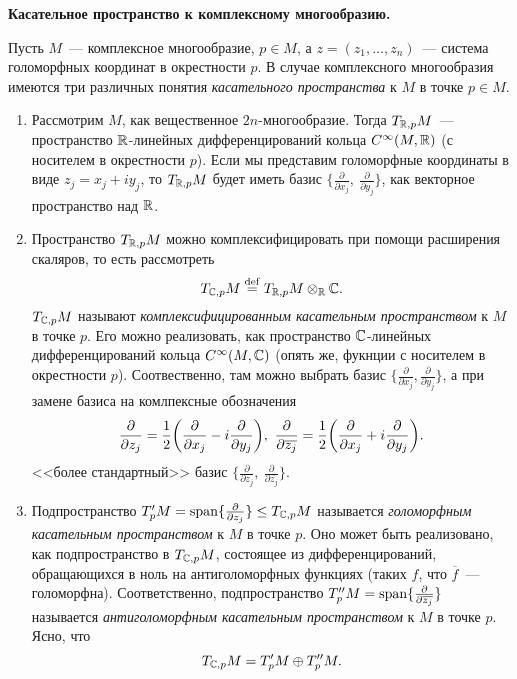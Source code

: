     \noindent\bf{Касательное пространство к комплексному многообразию.}\hypertarget{complex_tungent_space}{}

        Пусть $M$~--- комплексное многообразие, $p \in M$, а $z = (z_{1}, \ldots, z_n)$~--- система голоморфных координат в окрестности $p$.
        В случае комплексного многообразия имеются три различных понятия \emph{касательного пространства} к $M$ в точке $p \in M$.

        \begin{enumerate}
            \item Рассмотрим $M$, как вещественное $2n$-многообразие. Тогда $T_{\mathbb{R}, p}M$~--- пространство
            $\mathbb{R}$-линейных дифференцирований кольца $C^{\infty}(M, \mathbb{R})$ (с носителем в окрестности $p$).
            Если мы представим голоморфные координаты в виде $z_j = x_j + i y_j$, то $T_{\mathbb{R}, p}M$ будет иметь базис
            $\{ \frac{\partial }{\partial x_j}, \ \frac{\partial}{\partial y_j}\}$, как векторное пространство над $\mathbb{R}$.

            \item Пространство  $T_{\mathbb{R}, p}M$ можно комплексифицировать при помощи расширения скаляров, то есть рассмотреть
            \[ T_{\mathbb{C}, p}M \stackrel{\mathrm{def}}{=} T_{\mathbb{R}, p}M \otimes_{\mathbb{R}} \mathbb{C}. \]
            $T_{\mathbb{C}, p}M$ называют \emph{комплексифицированным касательным пространством} к $M$ в точке $p$.
            Его можно реализовать, как пространство $\mathbb{C}$-линейных дифференцирований кольца $C^{\infty}(M, \mathbb{C})$ (опять же, фукнции с носителем в окрестности $p$).
            Соотвественно, там можно выбрать базис $\{ \frac{\partial}{\partial x_j}, \frac{\partial}{\partial y_j}\}$, а при замене базиса на комлпексные обозначения
            \[ \frac{\partial}{\partial z_j} = \frac{1}{2} \lr*{\frac{\partial}{\partial x_j} - i \frac{\partial}{\partial y_j}}, \ \frac{\partial}{\partial\overline{z_j}} = \frac{1}{2}\lr*{\frac{\partial}{\partial x_j} + i \frac{\partial}{\partial y_j}}. \]
            <<более стандартный>> базис $\{ \frac{\partial}{\partial z_j}, \ \frac{\partial}{\partial \overline{z_j}}\}$.

            \item Подпространство $T'_{p}M = \operatorname{span}\{ \frac{\partial }{\partial z_j} \} \le T_{\mathbb{C}, p}M$ называется  \emph{голоморфным касательным пространством} к $M$
            в точке $p$. Оно может быть реализовано, как подпространство в $T_{\mathbb{C}, p}M$, состоящее из дифференцирований, обращающихся в ноль на антиголоморфных функциях (таких $f$, что $\overline{f}$~--- голоморфна).
            Соответственно, подпространство $T''_{p}M = \operatorname{span} \{ \frac{\partial }{\partial \overline{z_j}}\}$ называется \emph{антиголоморфным касательным пространством} к $M$ в точке $p$.
            Ясно, что
            \[ T_{\mathbb{C}, p}M = T'_{p}M \oplus T''_{p}M. \]
        \end{enumerate}

